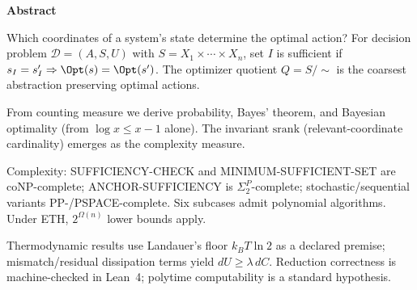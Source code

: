 \textbf{Abstract}

Which coordinates of a system's state determine the optimal action? For decision problem $\mathcal{D}=(A,S,U)$ with $S=X_1\times\cdots\times X_n$, set $I$ is sufficient if $s_I=s'_I\Rightarrow\Opt(s)=\Opt(s')$. The optimizer quotient $Q=S/{\sim}$ is the coarsest abstraction preserving optimal actions.

From counting measure we derive probability, Bayes' theorem, and Bayesian optimality (from $\log x\leq x-1$ alone). The invariant $\mathrm{srank}$ (relevant-coordinate cardinality) emerges as the complexity measure.

Complexity: SUFFICIENCY-CHECK and MINIMUM-SUFFICIENT-SET are coNP-complete; ANCHOR-SUFFICIENCY is $\Sigma_2^P$-complete; stochastic/sequential variants PP-/PSPACE-complete. Six subcases admit polynomial algorithms. Under ETH, $2^{\Omega(n)}$ lower bounds apply.

Thermodynamic results use Landauer's floor $k_BT\ln 2$ as a declared premise; mismatch/residual dissipation terms yield $dU\geq\lambda\,dC$. Reduction correctness is machine-checked in Lean~4; polytime computability is a standard hypothesis.
